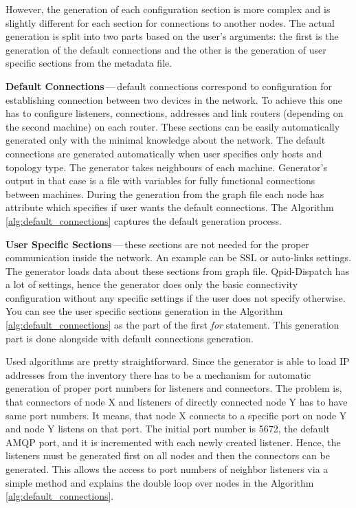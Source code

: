 However, the generation of each configuration section is more complex and is slightly different for each section for connections to another nodes. The actual generation is split into two parts based on the user's arguments: the first is the generation of the default connections and the other is the generation of user specific sections from the metadata file.

\begin{description}
	\item \textbf{Default Connections}\,---\,default connections correspond to configuration for establishing connection between two devices in the network. To achieve this one has to configure listeners, connections, addresses and link routers (depending on the second machine) on each router. These sections can be easily automatically generated only with the minimal knowledge about the network. The default connections are generated automatically when user specifies only hosts and topology type. The generator takes neighbours of each machine. Generator's output in that case is a file with variables for fully functional connections between machines. During the generation from the graph file each node has attribute which specifies if user wants the default connections. The Algorithm \ref{alg:default_connections} captures the default generation process.

	\item \textbf{User Specific Sections}\,---\,these sections are not needed for the proper communication inside the network. An example can be SSL or auto-links settings. The generator loads data about these sections from graph file. Qpid-Dispatch has a lot of settings, hence the generator does only the basic connectivity configuration without any specific settings if the user does not specify otherwise. You can see the user specific sections generation in the Algorithm \ref{alg:default_connections} as the part of the first \emph{for} statement. This generation part is done alongside with default connections generation.

\end{description}

Used algorithms are pretty straightforward. Since the generator is able to load IP addresses from the inventory there has to be a mechanism for automatic generation of proper port numbers for listeners and connectors. The problem is, that connectors of node X and listeners of directly connected node Y has to have same port numbers. It means, that node X connects to a specific port on node Y and node Y listens on that port. The initial port number is 5672, the default AMQP port, and it is incremented with each newly created listener. Hence, the listeners must be generated first on all nodes and then the connectors can be generated. This allows the access to port numbers of neighbor listeners via a simple method and explains the double loop over nodes in the Algorithm \ref{alg:default_connections}.

